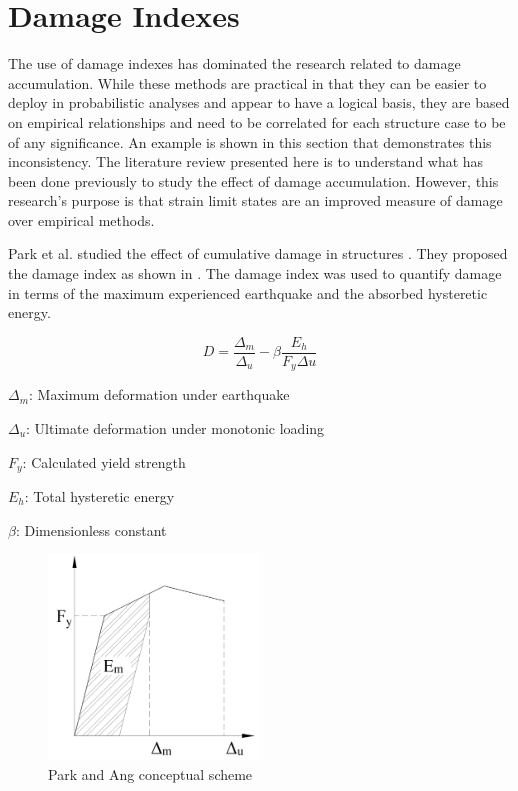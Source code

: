 \newpage

\section{Damage Indexes}
The use of damage indexes has dominated the research related to damage accumulation. While these methods are practical in that they can be easier to deploy in probabilistic analyses and appear to have a logical basis, they are based on empirical relationships and need to be correlated for each structure case to be of any significance. An example is shown in this section that demonstrates this inconsistency. The literature review presented here is to understand what has been done previously to study the effect of damage accumulation. However, this research's purpose is that strain limit states are an improved measure of damage over empirical methods.

Park et al. studied the effect of cumulative damage in structures \cite{Young-JiPark1985}. They proposed the damage index as shown in . The damage index was used to quantify damage in terms of the maximum experienced earthquake and the absorbed hysteretic energy.

\begin{equation}
  D=\frac{\Delta_{m}}{\Delta_{u}}-\beta \frac{E_h}{F_{y}\Delta{u}}
  \label{eq.DamageIndex}
\end{equation} 

$\Delta_{m}$: Maximum deformation under earthquake

$\Delta_{u}$: Ultimate deformation under monotonic loading

$F_{y}$: Calculated yield strength

$E_{h}$: Total hysteretic energy

$\beta$: Dimensionless constant 

\begin{figure}[htbp]
\centering
\includegraphics[width=0.50\textwidth]{Chapter-2/figs/Park_and_Ang_Model}
\caption{Park and Ang conceptual scheme}
\label{fig:Paa}
\end{figure}

